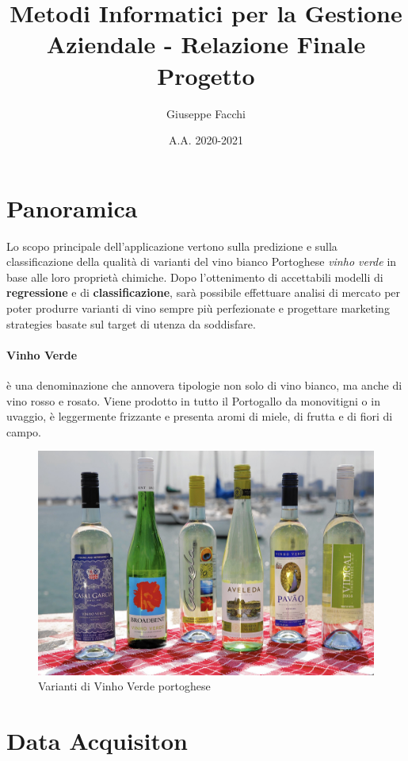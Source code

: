 \documentclass[12pt]{article}
\title{Metodi Informatici per la Gestione Aziendale - Relazione Finale Progetto}
\author{Giuseppe Facchi}
\date{A.A. 2020-2021}
\begin{document}
\maketitle
\newpage
\tableofcontents
\newpage

\section{Panoramica}
Lo scopo principale dell'applicazione vertono sulla predizione e sulla classificazione della qualità di varianti del vino bianco Portoghese \textit{vinho verde} in base alle loro proprietà chimiche. Dopo l'ottenimento di accettabili modelli di \textbf{regressione} e di \textbf{classificazione}, sarà possibile effettuare analisi di mercato per poter produrre varianti di vino sempre più perfezionate e progettare marketing strategies basate sul target di utenza da soddisfare.
\paragraph{Vinho Verde} è una denominazione che annovera tipologie non solo di vino bianco, ma anche di vino rosso e rosato. Viene prodotto in tutto il Portogallo da monovitigni o in uvaggio, è leggermente frizzante e presenta aromi di miele, di frutta e di fiori di campo.
\begin{figure}[!htb]
    \centering
    \includegraphics[width=1\textwidth]{immagini/vin.jpg}
    \caption{Varianti di Vinho Verde portoghese}
\end{figure}
\FloatBarrier
\newpage
\section{Data Acquisiton}
\end{document}
